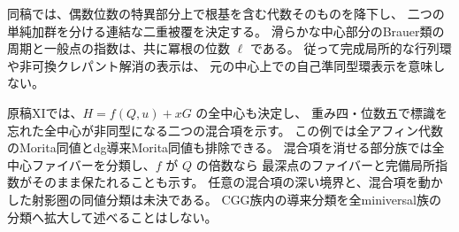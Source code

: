 同稿では、偶数位数の特異部分上で根基を含む代数そのものを降下し、
二つの単純加群を分ける連結な二重被覆を決定する。
滑らかな中心部分のBrauer類の周期と一般点の指数は、共に冪根の位数 $\ell$ である。
従って完成局所的な行列環や非可換クレパント解消の表示は、
元の中心上での自己準同型環表示を意味しない。

原稿XIでは、$H=f(Q,u)+xG$ の全中心も決定し、
重み四・位数五で標識を忘れた全中心が非同型になる二つの混合項を示す。
この例では全アフィン代数のMorita同値とdg導来Morita同値も排除できる。
混合項を消せる部分族では全中心ファイバーを分類し、$f$ が $Q$ の倍数なら
最深点のファイバーと完備局所指数がそのまま保たれることも示す。
任意の混合項の深い境界と、混合項を動かした射影圏の同値分類は未決である。
CGG族内の導来分類を全miniversal族の分類へ拡大して述べることはしない。
